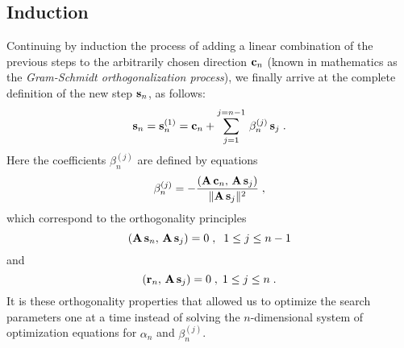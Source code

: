 \subsection{Induction}
Continuing by induction the process of adding a linear combination of
the previous steps to the arbitrarily chosen direction ${\bf c}_n$
(known in mathematics as the {\em Gram-Schmidt orthogonalization
process}), we finally arrive at the complete definition of the new
step ${\bf s}_n$, as follows:
\begin{equation}
{\bf s}_n = {\bf s}_n^{(1)} =  
{\bf c}_{n} + \sum_{j=1}^{j=n-1}\,\beta_n^{(j)}\,{\bf s}_{j}\;.
\label{eqn:step}
\end{equation}
Here the coefficients $\beta_n^{(j)}$ are defined by equations
\begin{equation}
\beta_n^{(j)} = 
- {{\left({\bf A\,c}_n,\,{\bf A\,s}_{j}\right)} \over
{\|{\bf A\,s}_{j}\|^2}}\;,
\label{eqn:betaj}
\end{equation} 
which correspond to the orthogonality principles
\begin{equation}
\left({\bf A\,s}_n,\,{\bf A\,s}_{j}\right) = 0\;,\;\;1 \leq j \leq n-1
\label{eqn:asj}
\end{equation}
and
\begin{equation}
\left({\bf r}_{n},\,{\bf A\,s}_{j}\right) = 0\;,\;1 \leq j \leq n\;.
\label{eqn:rasnj}
\end{equation}
It is these orthogonality properties that allowed us to optimize the
search parameters one at a time instead of solving the $n$-dimensional
system of optimization equations for $\alpha_n$ and $\beta_n^{(j)}$.

